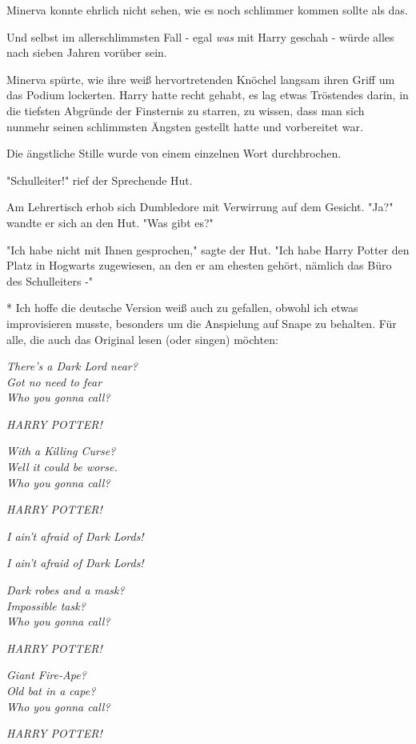 {Minerva konnte ehrlich nicht sehen, wie es noch schlimmer kommen sollte als das.

Und selbst im allerschlimmsten Fall - egal \emph{was} mit Harry geschah - würde alles nach sieben Jahren vorüber sein.

Minerva spürte, wie ihre weiß hervortretenden Knöchel langsam ihren Griff um das Podium lockerten. Harry hatte recht gehabt, es lag etwas Tröstendes darin, in die tiefsten Abgründe der Finsternis zu starren, zu wissen, dass man sich nunmehr seinen schlimmsten Ängsten gestellt hatte und vorbereitet war.

Die ängstliche Stille wurde von einem einzelnen Wort durchbrochen.

"Schulleiter!" rief der Sprechende Hut.

Am Lehrertisch erhob sich Dumbledore mit Verwirrung auf dem Gesicht. "Ja?" wandte er sich an den Hut. "Was gibt es?"

"Ich habe nicht mit Ihnen gesprochen," sagte der Hut. "Ich habe Harry Potter den Platz in Hogwarts zugewiesen, an den er am ehesten gehört, nämlich das Büro des Schulleiters -"

* Ich hoffe die deutsche Version weiß auch zu gefallen, obwohl ich etwas improvisieren musste, besonders um die Anspielung auf Snape zu behalten. Für alle, die auch das Original lesen (oder singen) möchten:

\emph{There's a Dark Lord near?\\ Got no need to fear\\ Who you gonna call?}

\emph{HARRY POTTER!}

\emph{With a Killing Curse?\\ Well it could be worse.\\ Who you gonna call?}

\emph{HARRY POTTER!}

\emph{I ain't afraid of Dark Lords!}

\emph{I ain't afraid of Dark Lords!}

\emph{Dark robes and a mask?\\ Impossible task?\\ Who you gonna call?}

\emph{HARRY POTTER!}

\emph{Giant Fire-Ape?\\ Old bat in a cape?\\ Who you gonna call?}

\emph{HARRY POTTER!}

}
